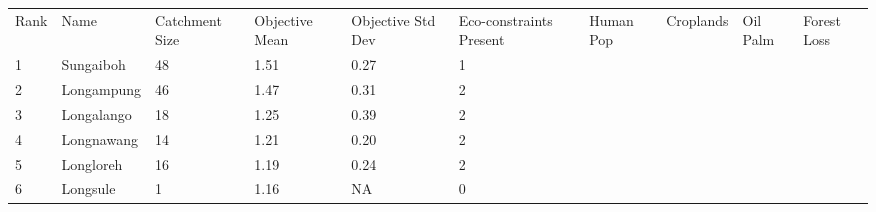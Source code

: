 \begin{table}[ht]
\centering
\begingroup\fontsize{8pt}{9pt}\selectfont
\begin{tabular}{C{0.03\textwidth}C{0.12\textwidth}C{0.09\textwidth}C{0.08\textwidth}C{0.08\textwidth}C{0.08\textwidth}C{0.07\textwidth}C{0.07\textwidth}C{0.07\textwidth}C{0.07\textwidth}}
 Rank & Name & Catchment Size & Objective Mean & Objective Std Dev & Eco-constraints  Present & Human Pop & Croplands & Oil Palm & Forest Loss \\ 
 {1} & Sungaiboh &  48 & \textcolor[HTML]{FFFFFF}{1.51} & \textcolor[HTML]{000000}{0.27} & \textcolor[HTML]{000000}{1} &  &  &  &  \\ 
  {2} & Longampung &  46 & \textcolor[HTML]{FFFFFF}{1.47} & \textcolor[HTML]{000000}{0.31} & \textcolor[HTML]{000000}{2} &  &  &  &  \\ 
  {3} & Longalango &  18 & \textcolor[HTML]{000000}{1.25} & \textcolor[HTML]{FFFFFF}{0.39} & \textcolor[HTML]{000000}{2} &  &  &  &  \\ 
  {4} & Longnawang &  14 & \textcolor[HTML]{000000}{1.21} & \textcolor[HTML]{000000}{0.20} & \textcolor[HTML]{000000}{2} &  &  &  &  \\ 
  {5} & Longloreh &  16 & \textcolor[HTML]{000000}{1.19} & \textcolor[HTML]{000000}{0.24} & \textcolor[HTML]{000000}{2} &  &  &  &  \\ 
  {6} & Longsule &   1 & \textcolor[HTML]{000000}{1.16} & \textcolor[HTML]{000000}{  NA} & \textcolor[HTML]{000000}{0} &  &  &  &  \\ 

\end{tabular}
\end{table}
